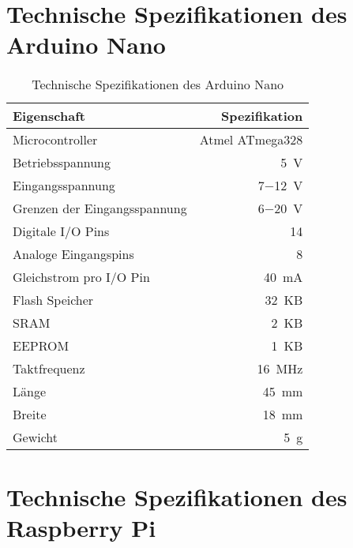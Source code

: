 \clearpage{}

\section{Technische Spezifikationen des Arduino\textsuperscript{\texttrademark} Nano}
\label{app:arduino}

\begin{table}[ht]
\begin{center}
\setlength{\tabcolsep}{20pt}
\begin{tabular}{lr}
\toprule
Eigenschaft & Spezifikation \\
\midrule
Microcontroller & Atmel ATmega328\\ \addlinespace
Betriebsspannung & \SI{5}{\volt}\\ \addlinespace
Eingangsspannung & \SI{7}{}$-$\SI{12}{\volt}\\ \addlinespace
Grenzen der Eingangsspannung & \SI{6}{}$-$\SI{20}{\volt}\\ \addlinespace
Digitale I/O Pins & \SI{14}{}\\ \addlinespace
Analoge Eingangspins & \SI{8}{}\\ \addlinespace
Gleichstrom pro I/O Pin & \SI{40}{\milli\ampere}\\ \addlinespace
Flash Speicher & \SI{32}{KB}\\ \addlinespace
SRAM & \SI{2}{KB} \\ \addlinespace
EEPROM & \SI{1}{KB}\\ \addlinespace
Taktfrequenz & \SI{16}{\mega\Hz}\\ \addlinespace
Länge & \SI{45}{\milli\meter}\\ \addlinespace
Breite & \SI{18}{\milli\meter}\\ \addlinespace
Gewicht & \SI{5}{\gram}\\
\bottomrule
\end{tabular}
\caption{Technische Spezifikationen des Arduino\textsuperscript{\texttrademark} Nano}
\end{center}
\label{tab:arduino}
\end{table}

\clearpage{}

\section{Technische Spezifikationen des Raspberry Pi\textsuperscript{\texttrademark}}
\label{app:raspberry}

